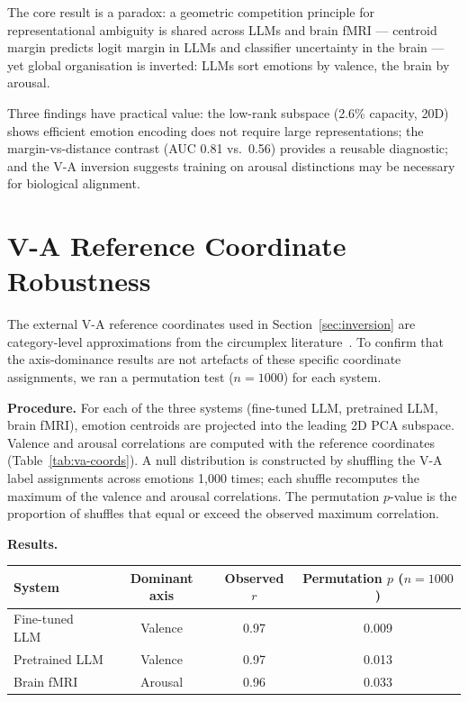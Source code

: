 \documentclass{article}
\begin{document}
The core result is a paradox: a geometric competition principle for representational
ambiguity is shared across LLMs and brain fMRI --- centroid margin predicts logit margin
in LLMs and classifier uncertainty in the brain --- yet global organisation is inverted:
LLMs sort emotions by valence, the brain by arousal.

Three findings have practical value: the low-rank subspace (2.6\% capacity, 20D)
shows efficient emotion encoding does not require large representations;
the margin-vs-distance contrast (AUC 0.81 vs.\ 0.56) provides a reusable diagnostic;
and the V-A inversion suggests training on arousal distinctions may be necessary for
biological alignment.

\newpage



\appendix

\section{V-A Reference Coordinate Robustness}
\label{app:va-sensitivity}

The external V-A reference coordinates used in Section~\ref{sec:inversion} are
category-level approximations from the circumplex literature~\citep{posner2005}.
To confirm that the axis-dominance results are not artefacts of these specific
coordinate assignments, we ran a permutation test ($n\!=\!1000$) for each system.

\textbf{Procedure.}
For each of the three systems (fine-tuned LLM, pretrained LLM, brain fMRI), emotion
centroids are projected into the leading 2D PCA subspace.
Valence and arousal correlations are computed with the reference coordinates
(Table~\ref{tab:va-coords}).
A null distribution is constructed by shuffling the V-A label assignments across
emotions 1,000 times; each shuffle recomputes the maximum of the valence and arousal
correlations.
The permutation $p$-value is the proportion of shuffles that equal or exceed the
observed maximum correlation.

\textbf{Results.}

\begin{center}
\small
\begin{tabular}{lccc}
\toprule
System & Dominant axis & Observed $r$ & Permutation $p$ ($n\!=\!1000$) \\
\midrule
Fine-tuned LLM  & Valence & 0.97 & 0.009 \\
Pretrained LLM  & Valence & 0.97 & 0.013 \\
Brain fMRI      & Arousal & 0.96 & 0.033 \\
\bottomrule
\end{tabular}
\end{center}
\end{document}
